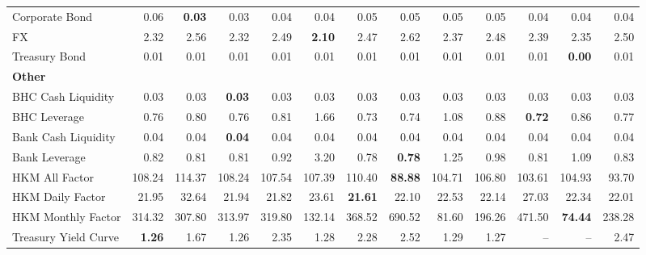 \begin{table}[htbp]
\begin{tabular}{@{}lrrrrrrrrrrrr@{}}
Corporate Bond & 0.06 & \textbf{0.03} & 0.03 & 0.04 & 0.04 & 0.05 & 0.05 & 0.05 & 0.05 & 0.04 & 0.04 & 0.04 \\
FX & 2.32 & 2.56 & 2.32 & 2.49 & \textbf{2.10} & 2.47 & 2.62 & 2.37 & 2.48 & 2.39 & 2.35 & 2.50 \\
Treasury Bond & 0.01 & 0.01 & 0.01 & 0.01 & 0.01 & 0.01 & 0.01 & 0.01 & 0.01 & 0.01 & \textbf{0.00} & 0.01 \\
\midrule
\multicolumn{13}{l}{\textbf{Other}} \\
BHC Cash Liquidity & 0.03 & 0.03 & \textbf{0.03} & 0.03 & 0.03 & 0.03 & 0.03 & 0.03 & 0.03 & 0.03 & 0.03 & 0.03 \\
BHC Leverage & 0.76 & 0.80 & 0.76 & 0.81 & 1.66 & 0.73 & 0.74 & 1.08 & 0.88 & \textbf{0.72} & 0.86 & 0.77 \\
Bank Cash Liquidity & 0.04 & 0.04 & \textbf{0.04} & 0.04 & 0.04 & 0.04 & 0.04 & 0.04 & 0.04 & 0.04 & 0.04 & 0.04 \\
Bank Leverage & 0.82 & 0.81 & 0.81 & 0.92 & 3.20 & 0.78 & \textbf{0.78} & 1.25 & 0.98 & 0.81 & 1.09 & 0.83 \\
HKM All Factor & 108.24 & 114.37 & 108.24 & 107.54 & 107.39 & 110.40 & \textbf{88.88} & 104.71 & 106.80 & 103.61 & 104.93 & 93.70 \\
HKM Daily Factor & 21.95 & 32.64 & 21.94 & 21.82 & 23.61 & \textbf{21.61} & 22.10 & 22.53 & 22.14 & 27.03 & 22.34 & 22.01 \\
HKM Monthly Factor & 314.32 & 307.80 & 313.97 & 319.80 & 132.14 & 368.52 & 690.52 & 81.60 & 196.26 & 471.50 & \textbf{74.44} & 238.28 \\
Treasury Yield Curve & \textbf{1.26} & 1.67 & 1.26 & 2.35 & 1.28 & 2.28 & 2.52 & 1.29 & 1.27 & -- & -- & 2.47 \\
\bottomrule
\end{tabular}
\vspace{0.1cm}

\end{table}
